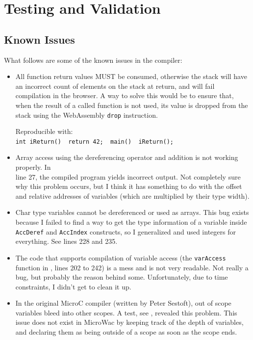 \documentclass[a4paper]{article}
\begin{document}
\section{Testing and Validation}
\label{sec:testing}

\subsection{Known Issues}
\label{sec:testing:known-issues}
What follows are some of the known issues in the compiler:
\begin{itemize}
	\item All function return values MUST be consumed, otherwise the stack will have an incorrect count of elements on the stack at return, and will fail compilation in the browser. A way to solve this would be to ensure that, when the result of a called function is not used, its value is dropped from the stack using the WebAssembly \texttt{drop} instruction.

	Reproducible with:\\
	\texttt{int iReturn() { return 42; } main() { iReturn(); }}

	\item Array access using the dereferencing operator and addition is not working properly. In\\ line 27, the compiled program yields incorrect output. Not completely sure why this problem occurs, but I think it has something to do with the offset and relative addresses of variables (which are multiplied by their type width).

	\item Char type variables cannot be dereferenced or used as arrays. This bug exists because I failed to find a way to get the type information of a variable inside \texttt{AccDeref} and \texttt{AccIndex} constructs, so I generalized and used integers for everything. See  lines 228 and 235.

	\item The code that supports compilation of variable access (the \texttt{varAccess} function in , lines 202 to 242) is a mess and is not very readable. Not really a bug, but probably the reason behind some.  Unfortunately, due to time constraints, I didn't get to clean it up.

	\item In the original MicroC compiler (written by Peter Sestoft), out of scope variables bleed into other scopes. A test, see , revealed this problem. This issue does not exist in MicroWac by keeping track of the depth of variables, and declaring them as being outside of a scope as soon as the scope ends.
\end{itemize}
\end{document}
